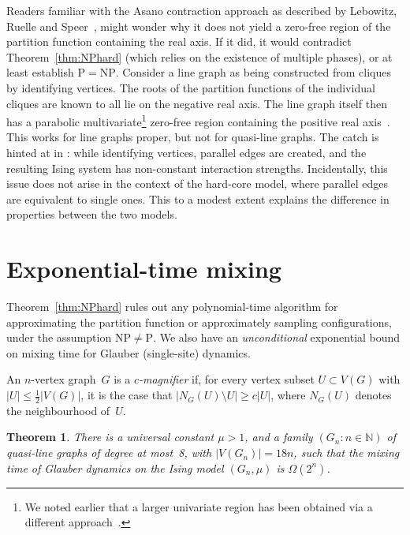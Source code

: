 \documentclass[11pt]{amsart}
\newcommand{\Nset}{\mathbb{N}}
\newtheorem{theorem}{Theorem}
\begin{document}
Readers familiar with the Asano contraction approach as described by Lebowitz, Ruelle and Speer~\cite{LebowitzRuelleSpeer}, might wonder why it does not yield a zero-free region of the partition function containing the real axis.  If it did, it would contradict Theorem~\ref{thm:NPhard} (which relies on the existence of multiple phases), or at least establish $\mathrm{P}=\mathrm{NP}$.  Consider a line graph as being constructed from cliques by identifying vertices. The roots of the partition functions of the individual cliques are known to all lie on the negative real axis.  The line graph itself then has a parabolic multivariate\footnote{We noted earlier that a larger univariate region has been obtained via a different approach~\cite{BencsCsikvariRegts}.} zero-free region containing the positive real axis~\cite{LebowitzRuelleSpeer,ChenLiuVigodaHolant}.  This works for line graphs proper, but not for quasi-line graphs.  The catch is hinted at in \cite[Ex.~2.2(c)]{LebowitzRuelleSpeer}:  while identifying vertices, parallel edges are created, and the resulting Ising system has non-constant interaction strengths.  Incidentally, this issue does not arise in the context of the hard-core model, where parallel edges are equivalent to single ones.  This to a modest extent explains the difference in properties between the two models.



\section{Exponential-time mixing}
Theorem~\ref{thm:NPhard} rules out any polynomial-time algorithm for approximating the partition function or approximately sampling configurations, under the assumption $\mathrm{NP}\not=\mathrm{P}$.  We also have an \emph{unconditional} exponential bound on mixing  time for Glauber (single-site) dynamics.  

An $n$-vertex graph~$G$ is a \emph{$c$-magnifier} if, for every vertex subset $U\subset V(G)$ with $|U|\leq\frac12|V(G)|$, it is the case that $|N_G(U)\setminus U|\geq c|U|$, where $N_G(U)$ denotes the neighbourhood of~$U$.

\begin{theorem}\label{thm:torpid}
There is a universal constant $\mu>1$, and a family $(G_n:n\in\Nset)$ of quasi-line graphs of degree at most~8, with $|V(G_n)|=18n$, such that the mixing time of Glauber dynamics on the Ising model $(G_n,\mu)$ is $\Omega(2^n)$.  
\end{theorem}
\end{document}
